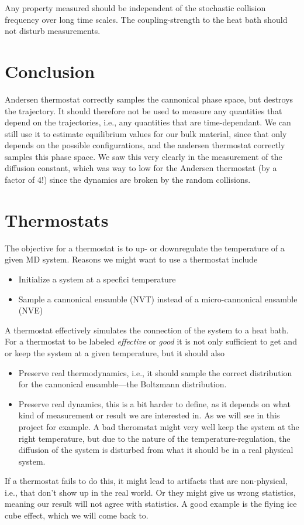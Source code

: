 \documentclass[a4paper, 11pt, notitlepage, english]{article}
\begin{document}
Any property measured should be independent of the stochastic collision frequency over long time scales. The coupling-strength to the heat bath should not disturb measurements.

\section*{Conclusion}

Andersen thermostat correctly samples the cannonical phase space, but destroys the trajectory. It should therefore not be used to measure any quantities that depend on the trajectories, i.e., any quantities that are time-dependant. We can still use it to estimate equilibrium values for our bulk material, since that only depends on the possible configurations, and the andersen thermostat correctly samples this phase space. We saw this very clearly in the measurement of the diffusion constant, which was way to low for the Andersen thermostat (by a factor of 4!) since the dynamics are broken by the random collisions.


\section*{Thermostats}

The objective for a thermostat is to up- or downregulate the temperature of a given MD system. Reasons we might want to use a thermostat include
\begin{itemize}
	\item Initialize a system at a specfici temperature
	\item Sample a cannonical ensamble (NVT) instead of a micro-cannonical ensamble (NVE)
\end{itemize}

A thermostat effectively simulates the connection of the system to a heat bath. For a thermostat to be labeled \emph{effective} or \emph{good} it is not only sufficient to get and or keep the system at a given temperature, but it should also
\begin{itemize}
	\item Preserve real thermodynamics, i.e., it should sample the correct distribution for the cannonical ensamble---the Boltzmann distribution.
	\item Preserve real dynamics, this is a bit harder to define, as it depends on what kind of measurement or result we are interested in. As we will see in this project for example. A bad theromstat might very well keep the system at the right temperature, but due to the nature of the temperature-regulation, the diffusion of the system is disturbed from what it should be in a real physical system.
\end{itemize}
If a thermostat fails to do this, it might lead to artifacts that are non-physical, i.e., that don't show up in the real world. Or they might give us wrong statistics, meaning our result will not agree with statistics. A good example is the flying ice cube effect, which we will come back to.
\end{document}
